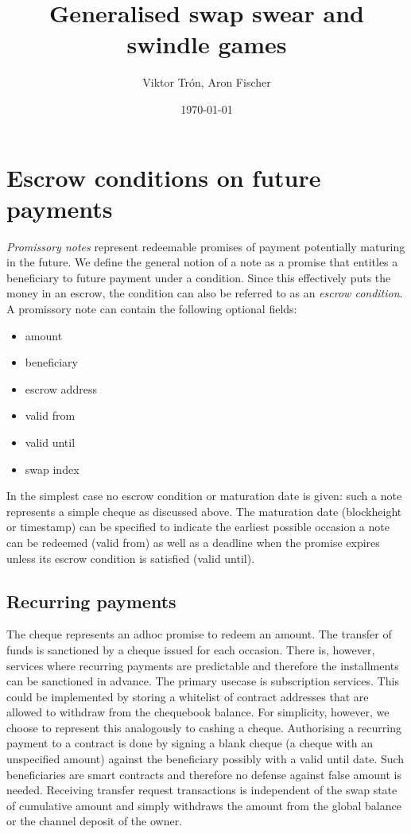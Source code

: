 \documentclass[a4paper,10pt]{article}
\title{Generalised swap swear and swindle games}
\author{Viktor Trón, Aron Fischer}
\date{\today}
\newcommand\gloss[1]{\emph{\gls{#1}}}
\begin{document}
\maketitle
\begin{abstract}
\end{abstract}

\tableofcontents






\section{Escrow conditions on future payments}

\gloss{Promissory notes} represent redeemable promises of payment potentially maturing in the future.
We define the general notion of a note as a promise that entitles a beneficiary to future payment
under a condition. Since this effectively puts the money in an escrow, the condition can
also be referred to as an \gloss{escrow condition}.
A promissory note can contain the following optional fields:

  \begin{itemize}
    \item amount
    \item beneficiary
    \item escrow address
    \item valid from
    \item valid until
    \item swap index
  \end{itemize}

In the simplest case no escrow condition or maturation date is given: such a note
represents a simple cheque as discussed above.
The maturation date (blockheight or timestamp) can be specified to indicate the earliest
possible occasion a note can be redeemed (valid from) as well as a deadline when the promise
expires unless its escrow condition is satisfied (valid until).

\subsection{Recurring payments}

The cheque represents an adhoc promise to redeem an amount.
The transfer of funds is sanctioned by a cheque issued for each occasion.
There is, however, services where recurring payments are predictable and therefore
the installments can be sanctioned in advance. The primary usecase is subscription
services.
This could be implemented by storing a whitelist of contract addresses that are allowed
to withdraw from the chequebook balance.
For simplicity, however, we choose to represent this analogously to cashing a cheque.
Authorising a recurring payment to a contract is done by signing a blank cheque (a cheque with
an unspecified amount) against the beneficiary possibly with a valid until date.
Such beneficiaries are smart contracts and therefore no defense against
false amount is needed.
Receiving transfer request transactions is independent of the swap state of cumulative amount
and simply withdraws the amount from the global balance or the channel deposit of the owner.
\end{document}
